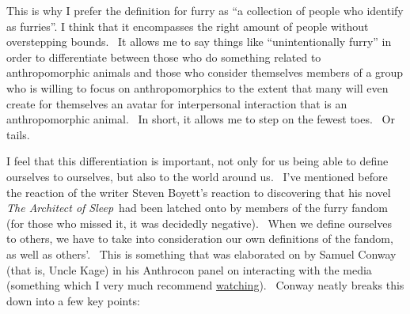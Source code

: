 This is why I prefer the definition for furry as ``a collection of
people who identify as furries''. I think that it encompasses the right
amount of people without overstepping bounds. ~It allows me to say
things like ``unintentionally furry'' in order to differentiate between
those who do something related to anthropomorphic animals and those who
consider themselves members of a group who is willing to focus on
anthropomorphics to the extent that many will even create for themselves
an avatar for interpersonal interaction that is an anthropomorphic
animal. ~In short, it allows me to step on the fewest toes. ~Or tails.

I feel that this differentiation is important, not only for us being
able to define ourselves to ourselves, but also to the world around us.
~I've mentioned before the reaction of the writer Steven Boyett's
reaction to discovering that his novel \emph{The Architect of Sleep}~had
been latched onto by members of the furry fandom (for those who missed
it, it was decidedly negative). ~When we define ourselves to others, we
have to take into consideration our own definitions of the fandom, as
well as others'. ~This is something that was elaborated on by Samuel
Conway (that is, Uncle Kage) in his Anthrocon panel on interacting with
the media (something which I very much recommend
\href{http://www.furrynewsnetwork.com/2011/07/uncle-kage-presents-furries-media-panel-ac2011/}{watching}).
~Conway neatly breaks this down into a few key points:

